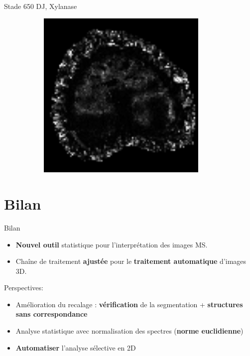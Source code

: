 \documentclass[10pt]{beamer}
\begin{document}
\begin{frame}{Stade 650 DJ, Xylanase}
\begin{figure}[ht]
\begin{subfigure}[t]{0.33\textwidth}
      
    \end{subfigure}%
    \begin{subfigure}[t]{0.33\textwidth}
      \centering
      \includegraphics[width=0.9\textwidth]{fig/stats_650Lich_t2}

    \end{subfigure}%
    
  \end{figure}
\end{frame}

\section{Bilan}

\begin{frame}{Bilan}

  \begin{itemize}
  \item \textbf{Nouvel outil} statistique pour l'interprétation des images MS.

  \item Chaîne de traitement \textbf{ajustée} pour le \textbf{traitement automatique} d'images 3D.
  \end{itemize}





  \vspace{0.4cm}

  Perspectives:
  \begin{itemize}
  \item Amélioration du recalage : \textbf{vérification} de la segmentation + \textbf{structures sans correspondance}
  \item Analyse statistique avec normalisation des spectres (\textbf{norme euclidienne})
  \item \textbf{Automatiser} l'analyse sélective en 2D
  \end{itemize}


\end{frame}
\end{document}
